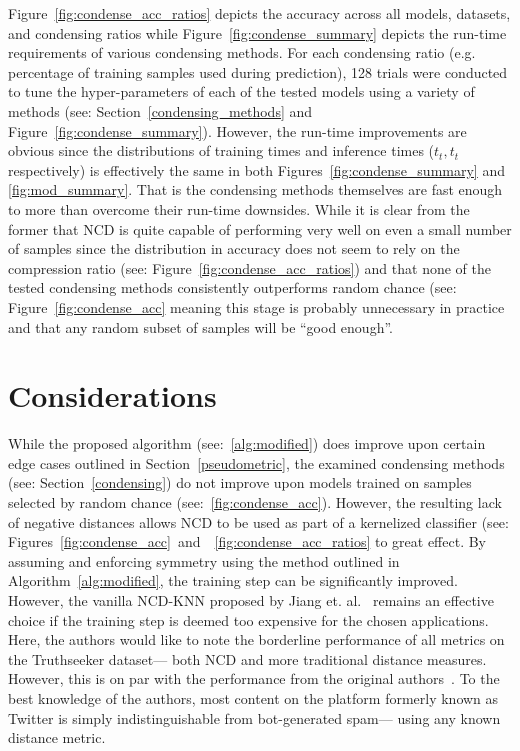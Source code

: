 \documentclass[conference]{IEEEtran}
\begin{document}
Figure~\ref{fig:condense_acc_ratios} depicts the accuracy across all models, datasets, and condensing ratios while Figure~\ref{fig:condense_summary} depicts the run-time requirements of various condensing methods. 
For each condensing ratio (e.g. percentage of training samples used during prediction), 128 trials were conducted to tune the hyper-parameters of each of the tested models using a variety of methods (see: Section~\ref{condensing_methods} and Figure~\ref{fig:condense_summary}). 
However, the run-time improvements are obvious since the distributions of training times and inference times ($t_t, t_t$ respectively) is effectively the same in both Figures~\ref{fig:condense_summary} and \ref{fig:mod_summary}. That is the condensing methods themselves are fast enough to more than overcome their run-time downsides. 
While it is clear from the former that NCD is quite capable of performing very well on even a small number of samples since the distribution in accuracy does not seem to rely on the compression ratio (see: Figure~\ref{fig:condense_acc_ratios}) and that none of the tested condensing methods consistently outperforms random chance (see: Figure~\ref{fig:condense_acc} meaning this stage is probably unnecessary in practice and that any random subset of samples will be ``good enough''. 

\vspace{-1em}
\section{Considerations}
\label{considerations}
While the proposed algorithm (see:~\ref{alg:modified}) does improve upon certain edge cases outlined in Section~\ref{pseudometric}, the examined condensing methods (see: Section~\ref{condensing}) do not improve upon models trained on samples selected by random chance (see:~\ref{fig:condense_acc}). However, the resulting lack of negative distances allows NCD to be used as part of a kernelized classifier (see: Figures~\ref{fig:condense_acc}~and~~\ref{fig:condense_acc_ratios} to great effect. 
By assuming and enforcing symmetry using the method outlined in Algorithm~\ref{alg:modified}, the training step can be significantly improved.
However, the vanilla NCD-KNN proposed by Jiang et. al.~\cite{jiang2022less} remains an effective choice if the training step is deemed too expensive for the chosen applications.
Here, the authors would like to note the borderline performance of all metrics on the Truthseeker dataset--- both NCD and more traditional distance measures. However, this is on par with the performance from the original authors~\cite{truthseeker}. To the best knowledge of the authors, most content on the platform formerly known as Twitter is simply indistinguishable from bot-generated spam--- using any known distance metric.
\end{document}
